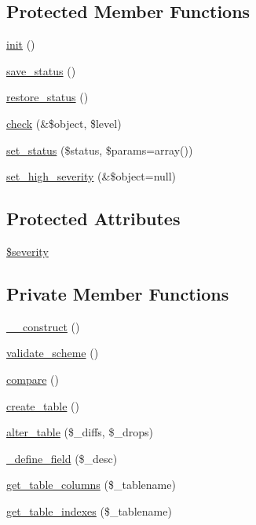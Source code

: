 \subsection*{Protected Member Functions}
\begin{DoxyCompactItemize}
\item 
\hyperlink{class__OWL_ae0ef3ded56e8a6b34b6461e5a721cd3e}{init} ()
\item 
\hyperlink{class__OWL_a9e49b9c76fbc021b244c6915ea536d71}{save\_\-status} ()
\item 
\hyperlink{class__OWL_a465eeaf40edd9f9c848841700c32ce55}{restore\_\-status} ()
\item 
\hyperlink{class__OWL_ad6f4f6946f40199dd0333cf219fa500e}{check} (\&\$object, \$level)
\item 
\hyperlink{class__OWL_aea912d0ede9b3c2a69b79072d94d4787}{set\_\-status} (\$status, \$params=array())
\item 
\hyperlink{class__OWL_a576829692a3b66e3d518853bf43abae3}{set\_\-high\_\-severity} (\&\$object=null)
\end{DoxyCompactItemize}
\subsection*{Protected Attributes}
\begin{DoxyCompactItemize}
\item 
\hyperlink{class__OWL_ad26b40a9dbbacb33e299b17826f8327c}{\$severity}
\end{DoxyCompactItemize}
\subsection*{Private Member Functions}
\begin{DoxyCompactItemize}
\item 
\hyperlink{classSchemeHandler_ae528fde31fe73647c614ef6f957c4caf}{\_\-\_\-construct} ()
\item 
\hyperlink{classSchemeHandler_a1d92dea6ea4643959609959bdce6f0d1}{validate\_\-scheme} ()
\item 
\hyperlink{classSchemeHandler_ae2a981feae465ef5e46782b4a18da1ad}{compare} ()
\item 
\hyperlink{classSchemeHandler_a87f623cc6ac1e44576d2415e36804218}{create\_\-table} ()
\item 
\hyperlink{classSchemeHandler_a7652ae28d0407f5be24fd67ad1b79e8d}{alter\_\-table} (\$\_\-diffs, \$\_\-drops)
\item 
\hyperlink{classSchemeHandler_a223d509509598fbc99741e910bda8cac}{\_\-define\_\-field} (\$\_\-desc)
\item 
\hyperlink{classSchemeHandler_ab8f222514c3aa614190201a6a8a9cedd}{get\_\-table\_\-columns} (\$\_\-tablename)
\item 
\hyperlink{classSchemeHandler_a23070e6253bcd9b0bc343bc582219638}{get\_\-table\_\-indexes} (\$\_\-tablename)
\end{DoxyCompactItemize}
